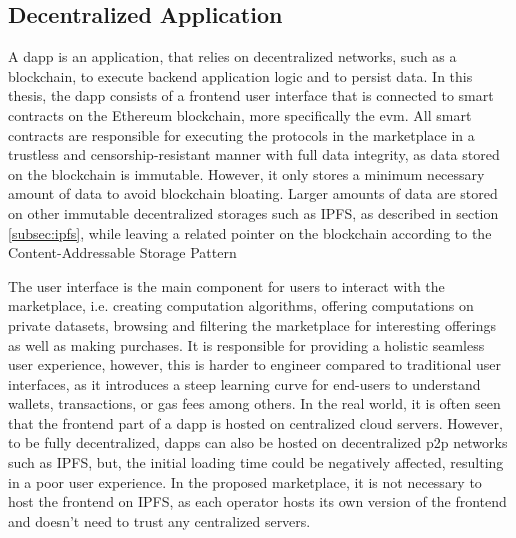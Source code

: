 \subsection{Decentralized Application}

A \acrfull{dapp} is an application, that relies on decentralized networks, such as a blockchain, to execute backend application logic and to persist data. In this thesis, the \acrshort{dapp} consists of a frontend user interface that is connected to smart contracts on the Ethereum blockchain, more specifically the \acrshort{evm}. All smart contracts are responsible for executing the protocols in the marketplace in a trustless and censorship-resistant manner with full data integrity, as data stored on the blockchain is immutable. However, it only stores a minimum necessary amount of data to avoid blockchain bloating. Larger amounts of data are stored on other immutable decentralized storages such as IPFS, as described in section \ref{subsec:ipfs}, while leaving a related pointer on the blockchain according to the Content-Addressable Storage Pattern \cite{eberhardtBlockchainInsightsOffChaining2017}

The user interface is the main component for users to interact with the marketplace, i.e. creating computation algorithms, offering computations on private datasets, browsing and filtering the marketplace for interesting offerings as well as making purchases. It is responsible for providing a holistic seamless user experience, however, this is harder to engineer compared to traditional user interfaces, as it introduces a steep learning curve for end-users to understand wallets, transactions, or gas fees among others. In the real world, it is often seen that the frontend part of a \acrshort{dapp} is hosted on centralized cloud servers. However, to be fully decentralized, \acrshort{dapp}s can also be hosted on decentralized \acrshort{p2p} networks such as IPFS, but, the initial loading time could be negatively affected, resulting in a poor user experience. In the proposed marketplace, it is not necessary to host the frontend on IPFS, as each operator hosts its own version of the frontend and doesn't need to trust any centralized servers. %

            
